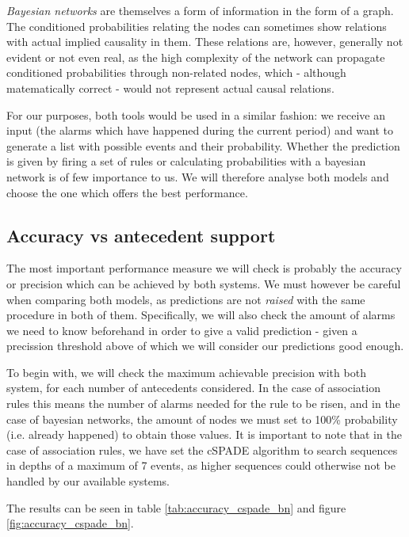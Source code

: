 \documentclass[a4paper,12pt]{article}
\begin{document}
\emph{Bayesian networks} are themselves a form of information in the form of a graph. The conditioned probabilities relating the nodes can sometimes show relations with actual implied causality in them. These relations are, however, generally not evident or not even real, as the high complexity of the network can propagate conditioned probabilities through non-related nodes, which - although matematically correct - would not represent actual causal relations.

For our purposes, both tools would be used in a similar fashion: we receive an input (the alarms which have happened during the current period) and want to generate a list with possible events and their probability. Whether the prediction is given by firing a set of rules or calculating probabilities with a bayesian network is of few importance to us. We will therefore analyse both models and choose the one which offers the best performance.

\subsection{Accuracy vs antecedent support}
The most important performance measure we will check is probably the accuracy or precision which can be achieved by both systems. We must however be careful when comparing both models, as predictions are not \emph{raised} with the same procedure in both of them. Specifically, we will also check the amount of alarms we need to know beforehand in order to give a valid prediction - given a precission threshold above of which we will consider our predictions good enough.

To begin with, we will check the maximum achievable precision with both system, for each number of antecedents considered. In the case of association rules this means the number of alarms needed for the rule to be risen, and in the case of bayesian networks, the amount of nodes we must set to 100\% probability (i.e. already happened) to obtain those values. It is important to note that in the case of association rules, we have set the cSPADE algorithm to search sequences in depths of a maximum of 7 events, as higher sequences could otherwise not be handled by our available systems.

The results can be seen in table \ref{tab:accuracy_cspade_bn} and figure \ref{fig:accuracy_cspade_bn}.
\end{document}
